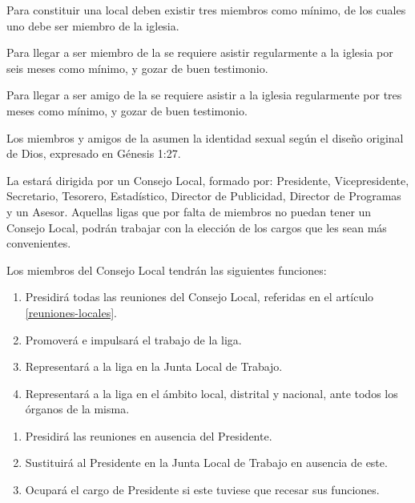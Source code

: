 

\article
Para constituir una \LMJ{} local deben existir tres miembros como mínimo, de los cuales uno debe ser miembro de la iglesia.

\article
\label{membresia-liga}
Para llegar a ser miembro de la \LMJ{} se requiere asistir regularmente a la iglesia por seis meses como mínimo, y gozar de buen testimonio.

\article
\label{amigo-liga}
Para llegar a ser amigo de la \LMJ{} se requiere asistir a la iglesia regularmente por tres meses como mínimo, y gozar de buen testimonio.

\article
\label{identidad-sexual}
Los miembros y amigos de la \LMJ{} asumen la identidad sexual según el diseño original de Dios, expresado en Génesis 1:27.

\article
La \LMJ{} estará dirigida por un Consejo Local, formado por: Presidente, Vicepresidente, Secretario, Tesorero, Estadístico, Director de Publicidad, Director de Programas y un Asesor.
Aquellas ligas que por falta de miembros no puedan tener un Consejo Local, podrán trabajar con la elección de los cargos que les sean más convenientes.

\article
Los miembros del Consejo Local tendrán las siguientes funciones:

\begin{enumerate}
    \item Presidirá todas las reuniones del Consejo Local, referidas en el artículo \ref{reuniones-locales}.
    \item Promoverá e impulsará el trabajo de la liga.
    \item Representará a la liga en la Junta Local de Trabajo.
    \item Representará a la liga en el ámbito local, distrital y nacional, ante todos los órganos de la misma.
\end{enumerate}

\begin{enumerate}
    \item Presidirá las reuniones en ausencia del Presidente.
    \item Sustituirá al Presidente en la Junta Local de Trabajo en ausencia de este.
    \item Ocupará el cargo de Presidente si este tuviese que recesar sus funciones.
\end{enumerate}


